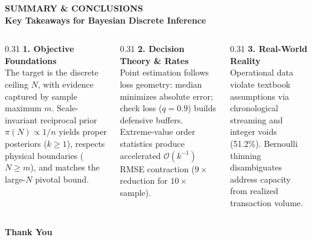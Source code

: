 \documentclass[aspectratio=169,10pt]{beamer}
\begin{document}
{
\begin{frame}[c,plain]
  \centering
  {\scriptsize \textbf{\color{accentcyan} SUMMARY \& CONCLUSIONS}}\\[0.12cm]
  {\Large \textbf{\color{white} Key Takeaways for Bayesian Discrete Inference}}\\[0.35cm]
  
  \begin{columns}[t,onlytextwidth]
    \begin{column}{0.31\textwidth}
      \centering
      {\small \textbf{\color{accentcyan} 1. Objective Foundations}}\\[0.10cm]
      {\scriptsize \color{white!85} The target is the discrete ceiling $N$, with evidence captured by sample maximum $m$. Scale-invariant reciprocal prior $\pi(N) \propto 1/n$ yields proper posteriors ($k \ge 1$), respects physical boundaries ($N \ge m$), and matches the large-$N$ pivotal bound.}
    \end{column}
    
    \begin{column}{0.31\textwidth}
      \centering
      {\small \textbf{\color{accentcyan} 2. Decision Theory \& Rates}}\\[0.10cm]
      {\scriptsize \color{white!85} Point estimation follows loss geometry: median minimizes absolute error; check loss ($q=0.9$) builds defensive buffers. Extreme-value order statistics produce accelerated $\mathcal{O}(k^{-1})$ RMSE contraction ($9\times$ reduction for $10\times$ sample).}
    \end{column}
    
    \begin{column}{0.31\textwidth}
      \centering
      {\small \textbf{\color{accentcyan} 3. Real-World Reality}}\\[0.10cm]
      {\scriptsize \color{white!85} Operational data violate textbook assumptions via chronological streaming and integer voids (51.2\%). Bernoulli thinning disambiguates address capacity from realized transaction volume.}
    \end{column}
  \end{columns}
  
  \vspace{0.30cm}
  \begin{center}
    \setlength{\fboxrule}{1pt}
  \end{center}
  
  \vspace{0.35cm}
  {\Large \textbf{\color{accentcyan} Thank You}}
\end{frame}
}
\end{document}
